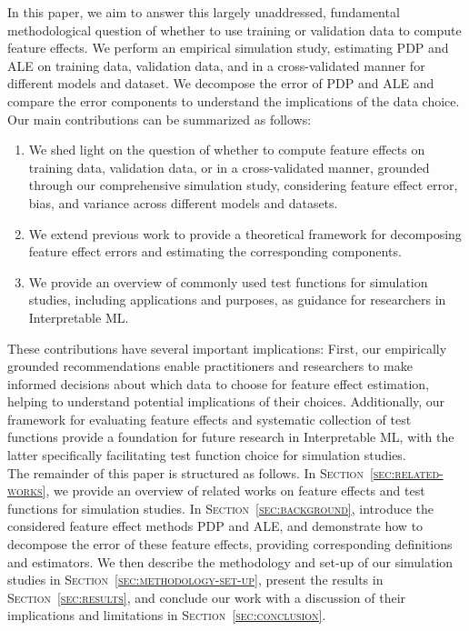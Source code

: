 \documentclass[runningheads]{llncs}
\begin{document}
\noindent In this paper, we aim to answer this largely unaddressed, fundamental
methodological question of whether to use training or validation data to
compute feature effects. We perform an empirical simulation study, estimating
PDP and ALE on training data, validation data, and in a cross-validated manner
for different models and dataset. We decompose the error of PDP and ALE and
compare the error components to understand the implications of the data choice.
Our main contributions can be summarized as follows:

\begin{enumerate}
    \item We shed light on the question of whether to compute feature effects on training
          data, validation data, or in a cross-validated manner, grounded through our
          comprehensive simulation study, considering feature effect error, bias, and
          variance across different models and datasets.
    \item We extend previous work to provide a theoretical framework for decomposing
          feature effect errors and estimating the corresponding components.
    \item We provide an overview of commonly used test functions for simulation studies,
          including applications and purposes, as guidance for researchers in
          Interpretable ML. %
\end{enumerate}

\noindent These contributions have several important implications: First, our empirically
grounded recommendations enable practitioners and researchers to make informed
decisions about which data to choose for feature effect estimation, helping to
understand potential implications of their choices. Additionally, our framework
for evaluating feature effects and systematic collection of test functions
provide a foundation for future research in Interpretable ML, with the latter
specifically facilitating test function choice for simulation studies.\\

\noindent The remainder of this paper is structured as follows. In
\textsc{Section~\ref{sec:related-works}}, we provide an overview of related
works on feature effects and test functions for simulation studies. In
\textsc{Section~\ref{sec:background}}, introduce the considered feature
effect methods PDP and ALE, and demonstrate how to decompose the error of these
feature effects, providing corresponding definitions and estimators.
We then describe the methodology and set-up of our simulation studies in
\textsc{Section~\ref{sec:methodology-set-up}}, present the results in
\textsc{Section~\ref{sec:results}}, and conclude our work with a discussion
of their implications and limitations in \textsc{Section~\ref{sec:conclusion}}.
\end{document}
